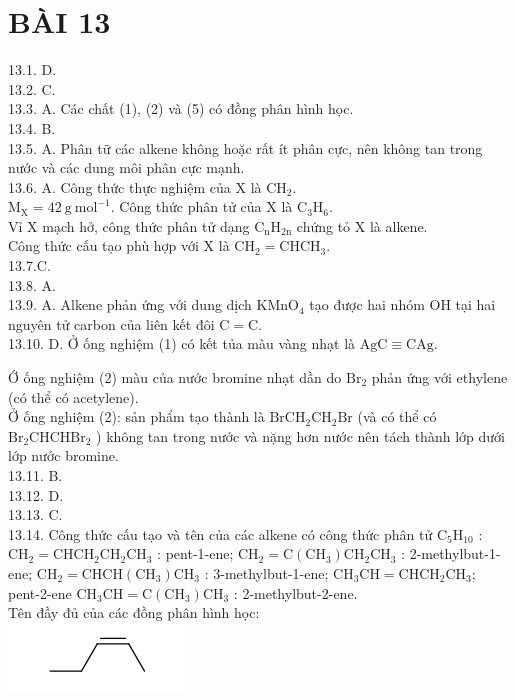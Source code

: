 \documentclass[10pt]{article}
\begin{document}
\section*{BÀI 13}
13.1. D.\\
13.2. C.\\
13.3. A. Các chất (1), (2) và (5) có đồng phân hình học.\\
13.4. B.\\
13.5. A. Phân tữ các alkene không hoặc rất ít phân cực, nên không tan trong nước và các dung môi phân cực mạnh.\\
13.6. A. Công thức thực nghiệm của X là $\mathrm{CH}_{2}$.\\
$\mathrm{M}_{\mathrm{X}}=42 \mathrm{~g} \mathrm{~mol}^{-1}$. Công thức phân tử của X là $\mathrm{C}_{3} \mathrm{H}_{6}$.\\
Vỉ X mạch hở, công thức phân tử dạng $\mathrm{C}_{\mathrm{n}} \mathrm{H}_{2 \mathrm{n}}$ chứng tỏ X là alkene.\\
Công thức cấu tạo phù hợp với X là $\mathrm{CH}_{2}=\mathrm{CHCH}_{3}$.\\
13.7.C.\\
13.8. A.\\
13.9. A. Alkene phản ứng với dung dịch $\mathrm{KMnO}_{4}$ tạo được hai nhóm OH tại hai nguyên tử carbon của liên kết đôi $\mathrm{C}=\mathrm{C}$.\\
13.10. D. Ở ống nghiệm (1) có kết tủa màu vàng nhạt là $\mathrm{AgC} \equiv \mathrm{CAg}$.

Ớ ống nghiệm (2) màu của nước bromine nhạt dần do $\mathrm{Br}_{2}$ phản ứng với ethylene (có thể có acetylene).\\
Ở ống nghiệm (2): sản phẩm tạo thành là $\mathrm{BrCH}_{2} \mathrm{CH}_{2} \mathrm{Br}$ (và có thể có $\mathrm{Br}_{2} \mathrm{CHCHBr}_{2}$ ) không tan trong nước và nặng hơn nước nên tách thành lớp dưới lớp nước bromine.\\
13.11. B.\\
13.12. D.\\
13.13. C.\\
13.14. Công thức cấu tạo và tên của các alkene có công thức phân tử $\mathrm{C}_{5} \mathrm{H}_{10}$ :\\
$\mathrm{CH}_{2}=\mathrm{CHCH}_{2} \mathrm{CH}_{2} \mathrm{CH}_{3}$ : pent-1-ene; $\mathrm{CH}_{2}=\mathrm{C}\left(\mathrm{CH}_{3}\right) \mathrm{CH}_{2} \mathrm{CH}_{3}$ : 2-methylbut-1-ene; $\mathrm{CH}_{2}=\mathrm{CHCH}\left(\mathrm{CH}_{3}\right) \mathrm{CH}_{3}$ : 3-methylbut-1-ene; $\mathrm{CH}_{3} \mathrm{CH}=\mathrm{CHCH}_{2} \mathrm{CH}_{3}$; pent-2-ene $\mathrm{CH}_{3} \mathrm{CH}=\mathrm{C}\left(\mathrm{CH}_{3}\right) \mathrm{CH}_{3}$ : 2-methylbut-2-ene.\\
Tên đầy đủ của các đồng phân hình học:\\
\includegraphics{smile-1b0d9c10054542f7ba5d2e07ccb057f16c5d35ba}
\end{document}
